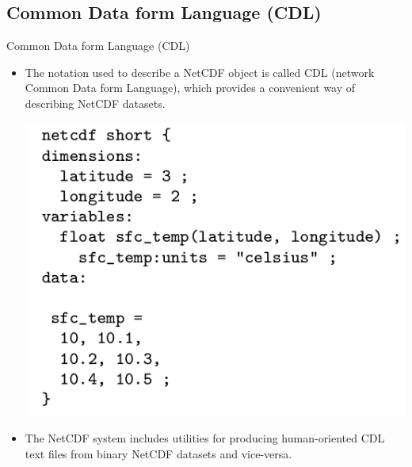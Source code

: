 \documentclass[compress,11pt,xcolor=svgnames,aspectratio=169]{beamer}
\begin{document}
\subsection{Common Data form Language (CDL)}

\begin{frame}[fragile]{Common Data form Language (CDL)}

\begin{itemize}
\setlength\itemsep{0.3cm}

\item The notation used to describe a NetCDF object is called CDL (network Common Data form Language), which provides a convenient way of describing NetCDF datasets.

\begin{center}
\includegraphics[scale=0.4]{fig/short-nc}\vspace{-0.2cm}
\end{center}

\item The NetCDF system includes utilities for producing human-oriented CDL text files from binary NetCDF datasets and vice-versa.

\end{itemize}

\nocite{netcdf}

\end{frame}
\end{document}
